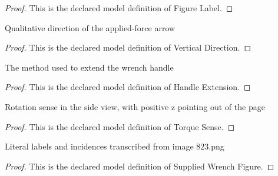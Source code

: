 \begin{proof}
  This is the declared model definition of Figure Label.
\end{proof}
\begin{definition}
  \label{def:physics:phyx-mini-0823:phyxminiproblems-problemphyxmini0823-verticaldirection}
  Qualitative direction of the applied-force arrow
\end{definition}
\begin{proof}
  This is the declared model definition of Vertical Direction.
\end{proof}
\begin{definition}
  \label{def:physics:phyx-mini-0823:phyxminiproblems-problemphyxmini0823-handleextension}
  The method used to extend the wrench handle
\end{definition}
\begin{proof}
  This is the declared model definition of Handle Extension.
\end{proof}
\begin{definition}
  \label{def:physics:phyx-mini-0823:phyxminiproblems-problemphyxmini0823-torquesense}
  Rotation sense in the side view, with positive z pointing out of the page
\end{definition}
\begin{proof}
  This is the declared model definition of Torque Sense.
\end{proof}
\begin{definition}
  \label{def:physics:phyx-mini-0823:phyxminiproblems-problemphyxmini0823-suppliedwrenchfigure}
  Literal labels and incidences transcribed from image 823.png
\end{definition}
\begin{proof}
  This is the declared model definition of Supplied Wrench Figure.
\end{proof}
